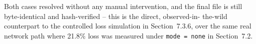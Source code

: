 \documentclass[11pt]{article}
\begin{document}
Both cases resolved without any manual intervention, and the final file is
still byte-identical and hash-verified -- this is the direct, observed-in-
the-wild counterpart to the controlled loss simulation in Section~7.3.6, over
the same real network path where 21.8\% loss was measured under
\texttt{mode = none} in Section~7.2.
\end{document}
